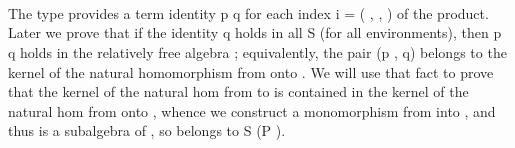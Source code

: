 \ifshort\else
\begin{code}%
\>[0][@{}l@{\AgdaIndent{1}}]%
\>[1]\AgdaSpace{}%
\AgdaSymbol{:}\AgdaSpace{}%
\AgdaSymbol{(}\AgdaSpace{}%
\AgdaSymbol{:}\AgdaSpace{}%
\AgdaSymbol{)}\AgdaSpace{}%
\AgdaSpace{}%
\AgdaSpace{}%
\AgdaSymbol{\}}\AgdaSpace{}%
\AgdaSpace{}%
\AgdaSpace{}%
\<%
\\
%
\>[1]\AgdaSpace{}%
\AgdaSpace{}%
\AgdaSymbol{\{}\AgdaSymbol{\}\{}\AgdaSymbol{\}}\AgdaSpace{}%
\AgdaSymbol{=}\AgdaSpace{}%
\AgdaSpace{}%
\AgdaSpace{}%
\AgdaSpace{}%
\AgdaSpace{}%
\AgdaSpace{}%
\AgdaSpace{}%
\AgdaSpace{}%
\AgdaSpace{}%
\AgdaSpace{}%
\AgdaSpace{}%
\AgdaSpace{}%
\AgdaSpace{}%
\AgdaSpace{}%
\AgdaSpace{}%
\AgdaSpace{}%
\AgdaSpace{}%
\<%
\\
\>[1][@{}l@{\AgdaIndent{0}}]%
\>[2]\AgdaSpace{}%
\AgdaSpace{}%
\AgdaSpace{}%
\AgdaOperator{\AgdaFunction{𝔻[}}\AgdaSpace{}%
\AgdaSpace{}%
\AgdaSpace{}%
\AgdaOperator{\AgdaFunction{]}}\AgdaSpace{}%
\AgdaSpace{}%
\AgdaSymbol{(}\AgdaSpace{}%
\AgdaSpace{}%
\AgdaSymbol{)}\AgdaSpace{}%
\AgdaSymbol{;}\AgdaSpace{}%
\AgdaSpace{}%
\AgdaSpace{}%
\AgdaSymbol{(}\AgdaSpace{}%
\AgdaSymbol{)}\AgdaSpace{}%
\AgdaSpace{}%
\AgdaSymbol{(}\AgdaSpace{}%
\AgdaSpace{}%
\AgdaSymbol{)}\<%
\\
\>[0]\<%
\end{code}

The type  provides a term identity \ab p  \ab q for each index \ab i = ( ,  , ) of the product.
Later we prove that if the identity   \ab q holds in all   \af S  (for all environments), then \ab p  \ab q
holds in the relatively free algebra ; equivalently, the pair (\ab p , \ab q) belongs to the
kernel of the natural homomorphism from  onto . We will use that fact to prove
that the kernel of the natural hom from  to  is contained in the kernel of the natural hom from  onto ,
whence we construct a monomorphism from  into , and thus  is a subalgebra of ,
so belongs to \af S (\af P ).

